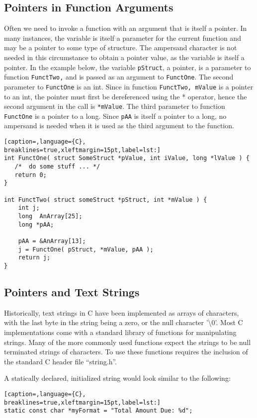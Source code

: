 \subsection{Pointers in Function Arguments}
Often we need to invoke a function with an argument that is itself a pointer.
In many instances, the variable is itself a parameter for the current function
and may be a pointer to some type of structure. The ampersand character is not
needed in this circumstance to obtain a pointer value, as the variable is
itself a pointer. In the example below, the variable \texttt{pStruct}, a
pointer, is a parameter to function \texttt{FunctTwo,} and is passed as an
argument to \texttt{FunctOne}.  The second parameter to \texttt{FunctOne} is an
int. Since in function \texttt{FunctTwo, mValue} is a pointer to an int, the
pointer must first be dereferenced using the * operator, hence the second
argument in the call is \texttt{*mValue}. The third parameter to function
\texttt{FunctOne} is a pointer to a long. Since \texttt{pAA} is itself a
pointer to a long, no ampersand is needed when it is used as the third argument
to the function.
\lstset{basicstyle=\scriptsize, numbers=left, captionpos=b, tabsize=4}
\begin{lstlisting}[caption=,language={C},
breaklines=true,xleftmargin=15pt,label=lst:]
int FunctOne( struct SomeStruct *pValue, int iValue, long *lValue ) {
   /*  do some stuff ... */
   return 0;
}

int FunctTwo( struct someStruct *pStruct, int *mValue ) {
	int j;
	long  AnArray[25];
	long *pAA;
	 
	pAA = &AnArray[13];
	j = FunctOne( pStruct, *mValue, pAA );
	return j;
}
\end{lstlisting}

\subsection{Pointers and Text Strings}
Historically, text strings in C have been implemented as arrays of characters,
with the last byte in the string being a zero, or the null character
'\textbackslash{}0'. Most C implementations come with a standard library of
functions for manipulating strings. Many of the more commonly used functions
expect the strings to be null terminated strings of characters.  To use these
functions requires the inclusion of the standard C header file ``string.h''. 

A statically declared, initialized string would look similar to the following:
\lstset{basicstyle=\scriptsize, numbers=left, captionpos=b, tabsize=4}
\begin{lstlisting}[caption=,language={C},
breaklines=true,xleftmargin=15pt,label=lst:]
static const char *myFormat = "Total Amount Due: %d";
\end{lstlisting}

